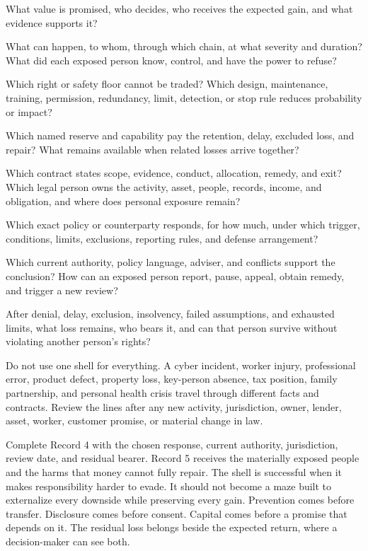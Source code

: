 \begin{description}[leftmargin=2.8em,style=nextline]
\item[Activity and upside] What value is promised, who decides, who receives
  the expected gain, and what evidence supports it?
\item[Exposure and consent] What can happen, to whom, through which chain, at
  what severity and duration? What did each exposed person know, control, and
  have the power to refuse?
\item[Refusal and prevention] Which right or safety floor cannot be traded?
  Which design, maintenance, training, permission, redundancy, limit,
  detection, or stop rule reduces probability or impact?
\item[Retention and capital] Which named reserve and capability pay the
  retention, delay, excluded loss, and repair? What remains available when
  related losses arrive together?
\item[Promise and containment] Which contract states scope, evidence,
  conduct, allocation, remedy, and exit? Which legal person owns the activity,
  asset, people, records, income, and obligation, and where does personal
  exposure remain?
\item[Insurance and transfer] Which exact policy or counterparty responds, for
  how much, under which trigger, conditions, limits, exclusions, reporting
  rules, and defense arrangement?
\item[Review and repair] Which current authority, policy language, adviser, and
  conflicts support the conclusion? How can an exposed person report, pause,
  appeal, obtain remedy, and trigger a new review?
\item[Residual bearer] After denial, delay, exclusion, insolvency, failed
  assumptions, and exhausted limits, what loss remains, who bears it, and can
  that person survive without violating another person's rights?
\end{description}

Do not use one shell for everything. A cyber incident, worker injury,
professional error, product defect, property loss, key-person absence, tax
position, family partnership, and personal health crisis travel through
different facts and contracts. Review the lines after any new activity,
jurisdiction, owner, lender, asset, worker, customer promise, or material
change in law.

Complete Record 4 with the chosen response, current authority, jurisdiction,
review date, and residual bearer. Record 5 receives the materially exposed
people and the harms that money cannot fully repair. The shell is successful
when it makes responsibility harder to evade. It
should not become a maze built to externalize every downside while preserving
every gain. Prevention comes before transfer. Disclosure comes before consent.
Capital comes before a promise that depends on it. The residual loss belongs
beside the expected return, where a decision-maker can see both.

